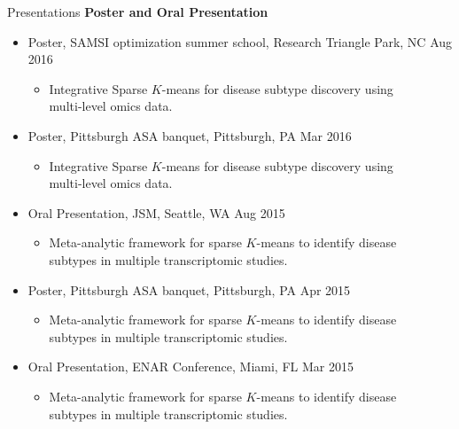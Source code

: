 \documentclass{resume} %
\begin{document}
\begin{rSection}{Presentations}
\textbf{Poster and Oral Presentation}

\begin{itemize}[noitemsep,topsep=0pt]
\item Poster, SAMSI optimization summer school,  Research Triangle Park, NC  \hfill {Aug 2016}
\begin{itemize}[noitemsep,topsep=0pt]
\item{Integrative Sparse $K$-means for disease subtype discovery using \\multi-level omics data.}
\end{itemize}

\item Poster, Pittsburgh ASA banquet, Pittsburgh, PA \hfill {Mar 2016}
\begin{itemize}[noitemsep,topsep=0pt]
\item{Integrative Sparse $K$-means for disease subtype discovery using \\multi-level omics data.}
\end{itemize}

\item Oral Presentation, JSM, Seattle, WA \hfill {Aug 2015}
\begin{itemize}[noitemsep,topsep=0pt]
\item{Meta-analytic framework for sparse $K$-means to identify disease\\ subtypes in multiple transcriptomic studies.}
\end{itemize}

\item Poster, Pittsburgh ASA banquet, Pittsburgh, PA \hfill {Apr 2015}
\begin{itemize}[noitemsep,topsep=0pt]
\item{Meta-analytic framework for sparse $K$-means to identify disease\\ subtypes in multiple transcriptomic studies.}
\end{itemize}

\item Oral Presentation, ENAR Conference, Miami, FL \hfill {Mar 2015}
\begin{itemize}[noitemsep,topsep=0pt]
\item{Meta-analytic framework for sparse $K$-means to identify disease\\ subtypes in multiple transcriptomic studies.}
\end{itemize}


\end{itemize}
\end{rSection}
\end{document}
